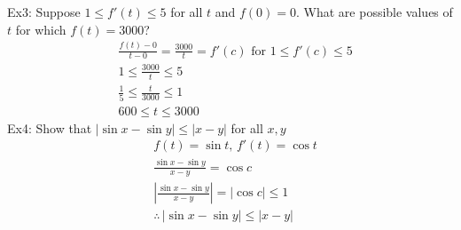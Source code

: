 \documentclass[11pt, fleqn]{article}
\begin{document}
Ex3: Suppose $1\leq f'(t)\leq 5$ for all $t$ and $f(0)=0$. What are possible values of $t$ for which $f(t)=3000$?
\begin{align*}
    &\frac{f(t)-0}{t-0}=\frac{3000}{t}=f'(c)\text{ for }1\leq f'(c)\leq 5\\
    &1\leq\frac{3000}{t}\leq 5\\
    &\frac{1}{5}\leq\frac{t}{3000}\leq 1\\
    &600\leq t\leq 3000
\end{align*}
Ex4: Show that $|\sin x-\sin y|\leq |x-y|$ for all $x,y$
\begin{align*}
    &f(t)=\sin t,\,f'(t)=\cos t\\
    &\frac{\sin x-\sin y}{x-y}=\cos c\\
    &\left|\frac{\sin x-\sin y}{x-y}\right|=|\cos c|\leq 1\\
    &\therefore\,|\sin x-\sin y|\leq |x-y|
\end{align*}
\end{document}
